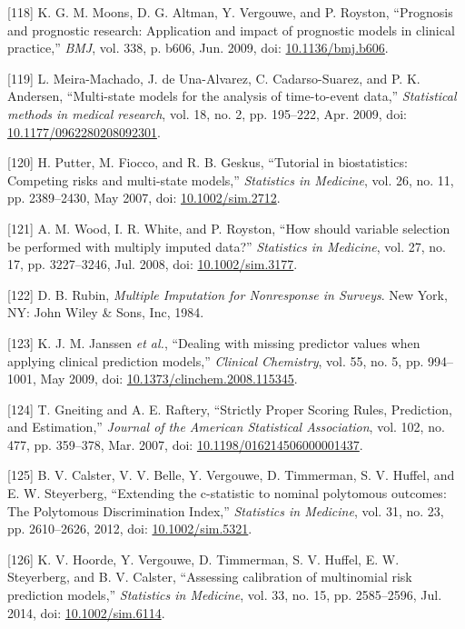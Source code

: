 \documentclass[12pt,PhD,twoside,openright]{muthesis}
\newenvironment{cslreferences}%
  {}%
  {\par}
\begin{document}
\begin{cslreferences}
\leavevmode\hypertarget{ref-moons_prognosis_2009-1}{}%
{[}118{]} K. G. M. Moons, D. G. Altman, Y. Vergouwe, and P. Royston, ``Prognosis and prognostic research: Application and impact of prognostic models in clinical practice,'' \emph{BMJ}, vol. 338, p. b606, Jun. 2009, doi: \href{https://doi.org/10.1136/bmj.b606}{10.1136/bmj.b606}.

\leavevmode\hypertarget{ref-meira-machado_multi-state_2009}{}%
{[}119{]} L. Meira-Machado, J. de Una-Alvarez, C. Cadarso-Suarez, and P. K. Andersen, ``Multi-state models for the analysis of time-to-event data,'' \emph{Statistical methods in medical research}, vol. 18, no. 2, pp. 195--222, Apr. 2009, doi: \href{https://doi.org/10.1177/0962280208092301}{10.1177/0962280208092301}.

\leavevmode\hypertarget{ref-putter_tutorial_2007}{}%
{[}120{]} H. Putter, M. Fiocco, and R. B. Geskus, ``Tutorial in biostatistics: Competing risks and multi-state models,'' \emph{Statistics in Medicine}, vol. 26, no. 11, pp. 2389--2430, May 2007, doi: \href{https://doi.org/10.1002/sim.2712}{10.1002/sim.2712}.

\leavevmode\hypertarget{ref-wood_how_2008}{}%
{[}121{]} A. M. Wood, I. R. White, and P. Royston, ``How should variable selection be performed with multiply imputed data?'' \emph{Statistics in Medicine}, vol. 27, no. 17, pp. 3227--3246, Jul. 2008, doi: \href{https://doi.org/10.1002/sim.3177}{10.1002/sim.3177}.

\leavevmode\hypertarget{ref-rubin_multiple_1984}{}%
{[}122{]} D. B. Rubin, \emph{Multiple Imputation for Nonresponse in Surveys}. New York, NY: John Wiley \& Sons, Inc, 1984.

\leavevmode\hypertarget{ref-janssen_dealing_2009}{}%
{[}123{]} K. J. M. Janssen \emph{et al.}, ``Dealing with missing predictor values when applying clinical prediction models,'' \emph{Clinical Chemistry}, vol. 55, no. 5, pp. 994--1001, May 2009, doi: \href{https://doi.org/10.1373/clinchem.2008.115345}{10.1373/clinchem.2008.115345}.

\leavevmode\hypertarget{ref-gneiting_strictly_2007}{}%
{[}124{]} T. Gneiting and A. E. Raftery, ``Strictly Proper Scoring Rules, Prediction, and Estimation,'' \emph{Journal of the American Statistical Association}, vol. 102, no. 477, pp. 359--378, Mar. 2007, doi: \href{https://doi.org/10.1198/016214506000001437}{10.1198/016214506000001437}.

\leavevmode\hypertarget{ref-calster_extending_2012-1}{}%
{[}125{]} B. V. Calster, V. V. Belle, Y. Vergouwe, D. Timmerman, S. V. Huffel, and E. W. Steyerberg, ``Extending the c-statistic to nominal polytomous outcomes: The Polytomous Discrimination Index,'' \emph{Statistics in Medicine}, vol. 31, no. 23, pp. 2610--2626, 2012, doi: \href{https://doi.org/10.1002/sim.5321}{10.1002/sim.5321}.

\leavevmode\hypertarget{ref-hoorde_assessing_2014}{}%
{[}126{]} K. V. Hoorde, Y. Vergouwe, D. Timmerman, S. V. Huffel, E. W. Steyerberg, and B. V. Calster, ``Assessing calibration of multinomial risk prediction models,'' \emph{Statistics in Medicine}, vol. 33, no. 15, pp. 2585--2596, Jul. 2014, doi: \href{https://doi.org/10.1002/sim.6114}{10.1002/sim.6114}.
\end{cslreferences}
\end{document}
